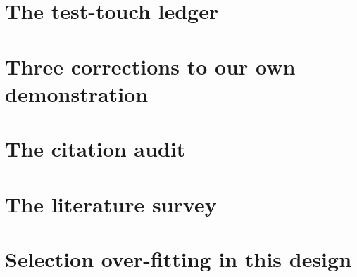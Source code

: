 \documentclass[11pt]{article}
\begin{document}


\appendix
\section{The test-touch ledger}\label{app:ledger}


\section{Three corrections to our own demonstration}\label{app:corrections}


\section{The citation audit}\label{app:citations}


\section{The literature survey}\label{app:survey}


\section{Selection over-fitting in this design}\label{app:selection}

\end{document}
